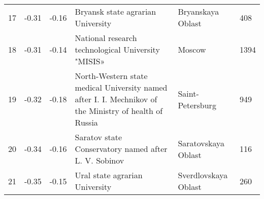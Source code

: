 \begin{table}[ht]
\begin{tabular}{rlllll}
  17 & -0.31 & -0.16 & Bryansk state agrarian University & Bryanskaya Oblast & 408 \\ 
  18 & -0.31 & -0.14 & National research technological University "MISIS» & Moscow & 1394 \\ 
  19 & -0.32 & -0.18 & North-Western state medical University named after I. I. Mechnikov of the Ministry of health of Russia & Saint-Petersburg & 949 \\ 
  20 & -0.34 & -0.16 & Saratov state Conservatory named after L. V. Sobinov & Saratovskaya Oblast & 116 \\ 
  21 & -0.35 & -0.15 & Ural state agrarian University & Sverdlovskaya Oblast & 260 \\ 
   \hline
\end{tabular}
\end{table}



